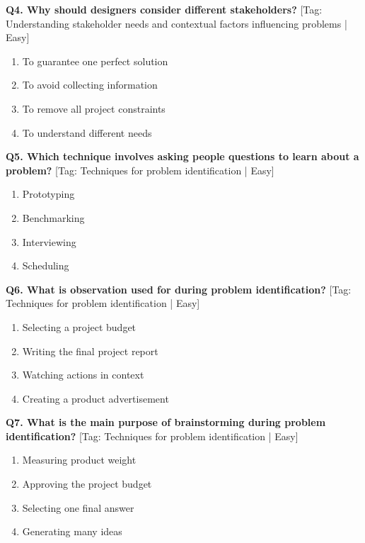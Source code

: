 \noindent\textbf{Q4. Why should designers consider different stakeholders?} \hfill [Tag: Understanding stakeholder needs and contextual factors influencing problems | Easy]
\begin{enumerate}[label=(\alph*),topsep=2pt,itemsep=1pt,partopsep=0pt,parsep=0pt]
    \item {To guarantee one perfect solution}
    \item {To avoid collecting information}
    \item {To remove all project constraints}
    \item {To understand different needs}
\end{enumerate}
\vspace{2mm}

\noindent\textbf{Q5. Which technique involves asking people questions to learn about a problem?} \hfill [Tag: Techniques for problem identification | Easy]
\begin{enumerate}[label=(\alph*),topsep=2pt,itemsep=1pt,partopsep=0pt,parsep=0pt]
    \item {Prototyping}
    \item {Benchmarking}
    \item {Interviewing}
    \item {Scheduling}
\end{enumerate}
\vspace{2mm}

\noindent\textbf{Q6. What is observation used for during problem identification?} \hfill [Tag: Techniques for problem identification | Easy]
\begin{enumerate}[label=(\alph*),topsep=2pt,itemsep=1pt,partopsep=0pt,parsep=0pt]
    \item {Selecting a project budget}
    \item {Writing the final project report}
    \item {Watching actions in context}
    \item {Creating a product advertisement}
\end{enumerate}
\vspace{2mm}

\noindent\textbf{Q7. What is the main purpose of brainstorming during problem identification?} \hfill [Tag: Techniques for problem identification | Easy]
\begin{enumerate}[label=(\alph*),topsep=2pt,itemsep=1pt,partopsep=0pt,parsep=0pt]
    \item {Measuring product weight}
    \item {Approving the project budget}
    \item {Selecting one final answer}
    \item {Generating many ideas}
\end{enumerate}
\vspace{2mm}

